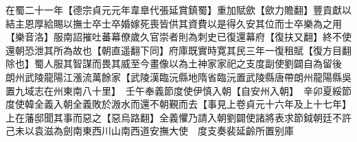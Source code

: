在蜀二十一年【德宗貞元元年韋臯代張延賞鎮蜀】重加賦歛【歛力贍翻】豐貢獻以結主恩厚給賜以撫士卒士卒婚嫁死喪皆供其資費以是得久安其位而士卒樂為之用【樂音洛】服南詔摧吐蕃幕僚歲久官崇者則為刺史已復還幕府【復扶又翻】終不使還朝恐泄其所為故也【朝直遥翻下同】府庫既實時寛其民三年一復租賦【復方目翻除也】蜀人服其智謀而畏其威至今畫像以為土神家家祀之支度副使劉闢自為留後　朗州武陵龍陽江漲流萬餘家【武陵漢臨沅縣地隋省臨沅置武陵縣唐帶朗州龍陽縣吳置九域志在州東南八十里】　壬午奉義節度使伊慎入朝【自安州入朝】　辛卯夏綏節度使韓全義入朝全義敗於溵水而還不朝覲而去【事見上卷貞元十六年及上十七年】上在藩邸聞其事而惡之【惡烏路翻】全義懼乃請入朝劉闢使諸將表求節鉞朝廷不許己未以袁滋為劍南東西川山南西道安撫大使　度支奏裴延齡所置别庫